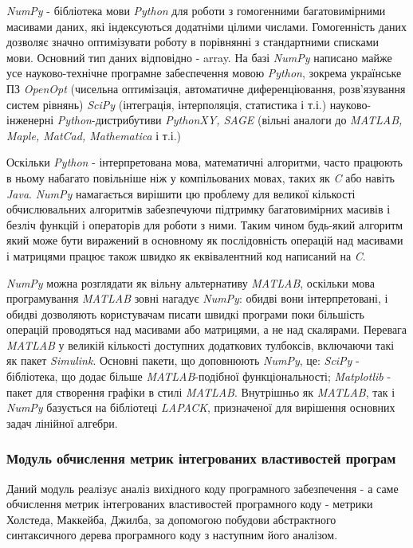 {\it NumPy} - бібліотека мови {\it Python} для роботи з гомогенними багатовимірними масивами даних, які індексуються додатніми цілими числами. Гомогенність даних дозволяє значно оптимізувати роботу в порівнянні з стандартними списками мови.
Основний тип даних відповідно - array.
На базі {\it NumPy} написано майже усе науково-технічне програмне забеспечення мовою {\it Python}, зокрема
українське ПЗ {\it OpenOpt} (чисельна оптимізація, автоматичне диференціювання, розв’язування систем рівнянь)
{\it SciPy} (інтеграція, інтерполяція, статистика і т.і.)
науково-інженерні {\it Python}-дистрибутиви {\it PythonXY, SAGE} (вільні аналоги до {\it MATLAB, Maple, MatCad, Mathematica} і т.і.)

Оскільки {\it Python} - інтерпретована мова, математичні алгоритми, часто працюють в ньому набагато повільніше ніж у компільованих мовах, таких як {\it C} або навіть {\it Java}. {\it NumPy} намагається вирішити цю проблему для великої кількості обчислювальних алгоритмів забезпечуючи підтримку багатовимірних масивів і безліч функцій і операторів для роботи з ними. Таким чином будь-який алгоритм який може бути виражений в основному як послідовність операцій над масивами і матрицями працює також швидко як еквівалентний код написаний на {\it C}.

{\it NumPy} можна розглядати як вільну альтернативу {\it MATLAB}, оскільки мова програмування {\it MATLAB} зовні нагадує {\it NumPy}: обидві вони інтерпретовані, і обидві дозволяють користувачам писати швидкі програми поки більшість операцій проводяться над масивами або матрицями, а не над скалярами. Перевага {\it MATLAB} у великій кількості доступних додаткових тулбоксів, включаючи такі як пакет {\it Simulink}. Основні пакети, що доповнюють {\it NumPy}, це: {\it SciPy} - бібліотека, що додає більше {\it MATLAB}-подібної функціональності; {\it Matplotlib} - пакет для створення графіки в стилі {\it MATLAB}. Внутрішньо як {\it MATLAB}, так і {\it NumPy} базується на бібліотеці {\it LAPACK}, призначеної для вирішення основних задач лінійної алгебри.

\subsubsection{Модуль обчислення метрик інтегрованих властивостей програм}
\label{module_metrix_calculations}
Даний модуль реалізує аналіз вихідного коду програмного забезпечення - а саме обчислення метрик інтегрованих властивостей програмного коду - метрики Холстеда, Маккейба, Джилба, за допомогою побудови абстрактного синтаксичного дерева програмного коду з наступним його аналізом.

